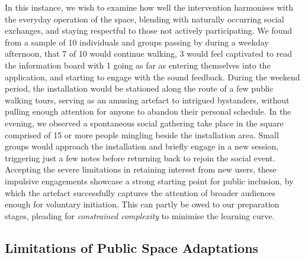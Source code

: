 In this instance, we wish to examine how well the intervention harmonises with the everyday operation of the space, blending with naturally occurring social exchanges, and staying respectful to those not actively participating. We found from a sample of 10 individuals and groups passing by during a weekday afternoon, that 7 of 10 would continue walking, 3 would feel captivated to read the information board with 1 going as far as entering themselves into the application, and starting to engage with the sound feedback. During the weekend period, the installation would be stationed along the route of a few public walking tours, serving as an amusing artefact to intrigued bystanders, without pulling enough attention for anyone to abandon their personal schedule. In the evening, we observed a spontaneous social gathering take place in the square comprised of 15 or more people mingling beside the installation area. Small groups would approach the installation and briefly engage in a new session, triggering just a few notes before returning back to rejoin the social event. Accepting the severe limitations in retaining interest from new users, these impulsive engagements showcase a strong starting point for public inclusion, by which the artefact successfully captures the attention of broader audiences enough for voluntary initiation. This can partly be owed to our preparation stages, pleading for \textit{constrained complexity} to minimise the learning curve.

\subsection*{Limitations of Public Space Adaptations}

